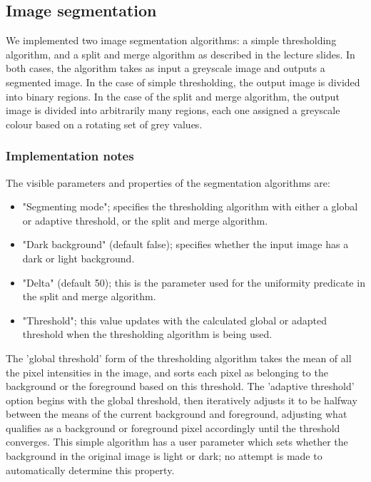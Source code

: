 \subsection{Image segmentation}
\label{sec:segmentation}

We implemented two image segmentation algorithms: a simple thresholding algorithm, and a split and merge algorithm as described in the lecture slides. In both cases, the algorithm takes as input a greyscale image and outputs a segmented image. In the case of simple thresholding, the output image is divided into binary regions. In the case of the split and merge algorithm, the output image is divided into arbitrarily many regions, each one assigned a greyscale colour based on a rotating set of grey values.

\subsubsection{Implementation notes}
The visible parameters and properties of the segmentation algorithms are:
\begin{itemize}
\item "Segmenting mode"; specifies the thresholding algorithm with either a global or adaptive threshold, or the split and merge algorithm.
\item "Dark background" (default false); specifies whether the input image has a dark or light background.
\item "Delta" (default 50); this is the parameter used for the uniformity predicate in the split and merge algorithm.
\item "Threshold"; this value updates with the calculated global or adapted threshold when the thresholding algorithm is being used.\\
\end{itemize}

The 'global threshold' form of the thresholding algorithm takes the mean of all the pixel intensities in the image, and sorts each pixel as belonging to the background or the foreground based on this threshold. The 'adaptive threshold' option begins with the global threshold, then iteratively adjusts it to be halfway between the means of the current background and foreground, adjusting what qualifies as a background or foreground pixel accordingly until the threshold converges. This simple algorithm has a user parameter which sets whether the background in the original image is light or dark; no attempt is made to automatically determine this property.

